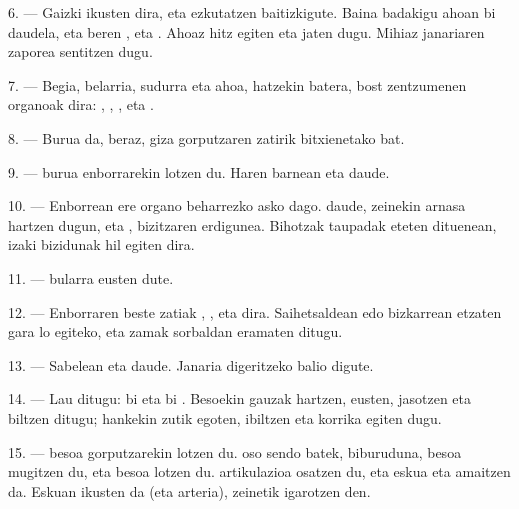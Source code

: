 6. --- Gaizki ikusten dira,  eta  ezkutatzen
baitizkigute. Baina badakigu ahoan bi  daudela,  eta  beren , eta
. Ahoaz hitz egiten eta jaten dugu. Mihiaz janariaren zaporea
sentitzen dugu.

7. --- Begia, belarria, sudurra eta ahoa, hatzekin batera, bost zentzumenen
organoak dira: , ,
,  eta .

8. --- Burua da, beraz, giza gorputzaren zatirik bitxienetako bat.

\VUsaut{4.4mm}
\VUsaut{3.0mm}

9. ---  burua enborrarekin lotzen du. Haren barnean
 eta  daude.

10. --- Enborrean ere organo beharrezko asko dago. 
 daude, zeinekin arnasa hartzen dugun, eta ,
bizitzaren erdigunea. Bihotzak taupadak eteten dituenean, izaki bizidunak hil
egiten dira.

11. ---  bularra eusten dute.

12. --- Enborraren beste zatiak , ,
 eta  dira. Saihetsaldean edo bizkarrean etzaten
gara lo egiteko, eta zamak sorbaldan eramaten ditugu.

13. --- Sabelean  eta  daude. Janaria digeritzeko
balio digute.

\VUsaut{4.4mm}
\VUsaut{3.0mm}

14. --- Lau  ditugu: bi  eta bi .
Besoekin gauzak hartzen, eusten, jasotzen eta biltzen ditugu; hankekin zutik
egoten, ibiltzen eta korrika egiten dugu.

15. ---  besoa gorputzarekin lotzen du.  oso
sendo batek, biburuduna, besoa mugitzen du, eta  besoa
 lotzen du.  
artikulazioa osatzen du, eta eskua  eta 
amaitzen da. Eskuan  ikusten da (eta arteria), zeinetik
 igarotzen den.

